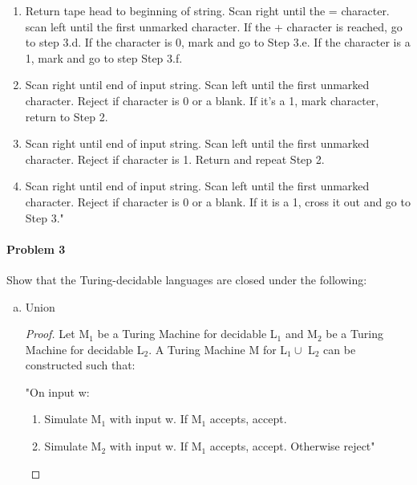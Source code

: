 ﻿\documentclass{article}
\begin{document}
\begin{enumerate}[a)]
\begin{enumerate}[1)]
\begin{enumerate}[(3.a)]
    \item Return tape head to beginning of string. Scan right until the = character. scan left until the first unmarked character. If the + character is reached, go to step 3.d. If the character is 0, mark and go to Step 3.e.  If the character is a 1, mark and go to step Step 3.f.
    
    \item Scan right until end of input string. Scan left until the first unmarked character. Reject if character is 0 or a blank. If it's a 1, mark character, return to Step 2.
    
    \item Scan right until end of input string. Scan left until the first unmarked character. Reject if character is 1. Return and repeat Step 2.
    
    \item Scan right until end of input string. Scan left until the first unmarked character. Reject if character is 0 or a blank. If it is a 1, cross it out and go to Step 3."
    

    \end{enumerate}
    


\end{enumerate}


\paragraph{Problem 3} Show that the Turing-decidable languages are closed under the following:
\begin{enumerate}[a)]

\item Union

\begin{proof}

Let M$_{1}$ be a Turing Machine for decidable L$_{1}$ and M$_{2}$ be a Turing Machine for decidable L$_{2}$. A Turing Machine M for L$_{1} \cup$ L$_{2}$ can be constructed such that:

"On input w:

\begin{enumerate} [1.]
\item Simulate M$_{1}$ with input w. If M$_{1}$ accepts, accept.
\item Simulate M$_{2}$ with input w. If M$_{1}$ accepts, accept. Otherwise reject"
\end{enumerate}


\end{proof}
\end{enumerate}
\end{enumerate}
\end{document}
